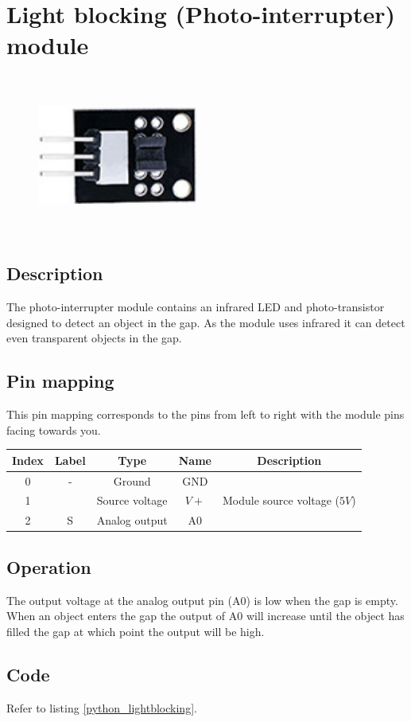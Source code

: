 \section{Light blocking (Photo-interrupter) module}
\begin{figure}[H]
    \centering
    \includegraphics[angle=0, keepaspectratio=true, scale=1, width=200px, height=200px]{images/light_blocking.jpg}
\end{figure}
\subsection*{Description}
The photo-interrupter module contains an infrared LED and photo-transistor designed to detect an object in the gap. As the module uses infrared it can detect even transparent objects in the gap.
\subsection*{Pin mapping}
This pin mapping corresponds to the pins from left to right with the module pins facing towards you.
\begin{table}[H]
    \centering
    \begin{tabular}{|c|c|c|c|c|}
    \hline
    Index &Label &Type &Name &Description\\ \hline
    0 &- &Ground &GND &\\ \hline
    1 & &Source voltage &$V+$ &Module source voltage ($5V$)\\ \hline
    2 &S &Analog output &A0 &\\ \hline
    \end{tabular}
\end{table}
\subsection*{Operation}
The output voltage at the analog output pin (A0) is low when the gap is empty. When an object enters the gap the output of A0 will increase until the object has filled the gap at which point the output will be high.
\subsection*{Code}
Refer to listing \ref{python_lightblocking}.
%